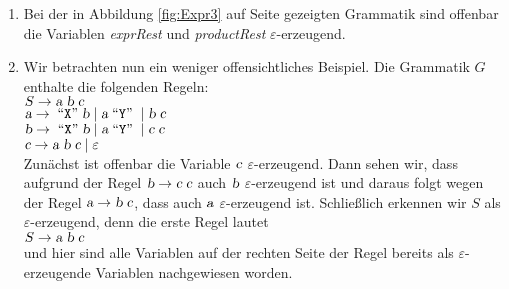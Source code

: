 \examples
\begin{enumerate}
\item Bei der in Abbildung \ref{fig:Expr3} auf Seite \pageref{fig:Expr3} gezeigten Grammatik
      sind offenbar die Variablen \textsl{exprRest} und \textsl{productRest} $\varepsilon$-erzeugend.
\item Wir betrachten nun ein weniger offensichtliches Beispiel.  Die Grammatik $G$
      enthalte die folgenden Regeln:
      \\[0.2cm]
      \hspace*{1.3cm}
      $S \rightarrow \textsl{a} \; \textsl{b} \; \textsl{c}$
      \\[0.2cm]
      \hspace*{1.3cm}
      $\textsl{a} \rightarrow \;\mbox{``\texttt{X}''}\; \textsl{b} \mid \textsl{a} \;\mbox{``\texttt{Y}''}\; \mid \textsl{b}\;\textsl{c}$
      \\[0.2cm]
      \hspace*{1.3cm}
      $\textsl{b} \rightarrow \;\mbox{``\texttt{X}''}\; \textsl{b} \mid \textsl{a} \;\mbox{``\texttt{Y}''}\; \mid \textsl{c}\;\textsl{c}$
      \\[0.2cm]
      \hspace*{1.3cm}
      $\textsl{c} \rightarrow \textsl{a}\;\textsl{b}\; \textsl{c} \mid \varepsilon$
      \\[0.2cm]
      Zunächst ist offenbar die Variable $\textsl{c}$ $\varepsilon$-erzeugend.  Dann sehen wir,
      dass aufgrund der Regel $\textsl{b} \rightarrow \textsl{c} \;\textsl{c}$ auch $\textsl{b}$ $\varepsilon$-erzeugend ist
      und daraus folgt wegen der Regel $\textsl{a} \rightarrow \textsl{b}\;\textsl{c}$, dass auch $\textsl{a}$
      $\varepsilon$-erzeugend ist.  Schließlich erkennen wir $S$ als $\varepsilon$-erzeugend,
      denn die erste Regel lautet
      \\[0.2cm]
      \hspace*{1.3cm}
      $S \rightarrow \textsl{a} \; \textsl{b} \; \textsl{c}$
      \\[0.2cm]
      und hier sind alle Variablen auf der rechten Seite der Regel bereits als
      $\varepsilon$-erzeugende Variablen nachgewiesen worden.
\end{enumerate}
 
